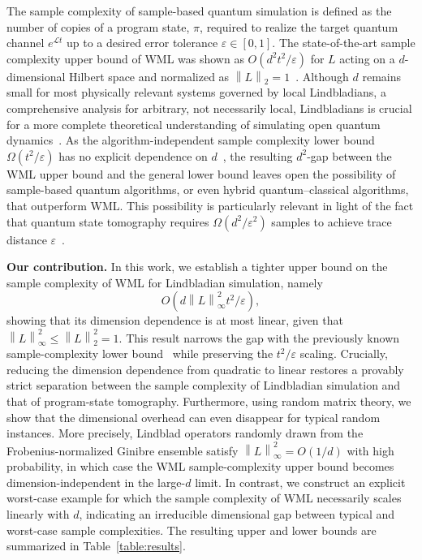 \documentclass[superscriptaddress,amsmath,amssymb,aps,pra,letterpaper,tightenlines,notitlepages,12pt]{revtex4-2}
\begin{document}
The sample complexity of sample-based quantum simulation is defined as the number of copies of a program state, $\pi$, required to realize the target quantum channel $e^{ \mathcal{L} t}$ up to a desired error tolerance $\varepsilon \in [0, 1]$. The state-of-the-art sample complexity upper bound of WML was shown as $O(d^2 t^2/\varepsilon)$ for $L$ acting on a $d$-dimensional Hilbert space and normalized as $\left\| L\right\|_2 = 1$~\cite{go2025SamplebasedHamiltonianLindbladian}. Although $d$ remains small for most physically relevant systems governed by local Lindbladians, a comprehensive analysis for arbitrary, not necessarily local, Lindbladians is crucial for a more complete theoretical understanding of simulating open quantum dynamics~\cite{kliesch2011DissipativeQuantumChurchTuring, cubitt2015StabilityLocalQuantuma, cleve2019EfficientQuantumAlgorithms, xu2019ExtremeDecoherenceQuantum, lin2025DissipativePreparationManybody}. As the algorithm-independent sample complexity lower bound $\Omega(t^2/\varepsilon)$ has no explicit dependence on $d$~\cite{go2025SamplebasedHamiltonianLindbladian}, the resulting $d^2$-gap between the WML upper bound and the general lower bound leaves open the possibility of sample-based quantum algorithms, or even hybrid quantum--classical algorithms, that outperform WML. This possibility is particularly relevant in light of the fact that quantum state tomography requires $\Omega(d^2/\varepsilon^2)$ samples to achieve trace distance $\varepsilon$~\cite{haah2016SampleoptimalTomographyQuantum, haah2017SampleoptimalTomographyQuantum, yuen2023ImprovedSampleComplexity, patel2023WaveMatrixLindbladizationa, anshu2023SurveyComplexityLearning}.

\bigskip

\noindent
\textbf{Our contribution.} In this work, we establish a tighter upper bound on the sample complexity of WML for Lindbladian simulation, namely
\begin{equation}
    O(d \left\|L\right\|_\infty^2 t^2/\varepsilon),
\end{equation} 
showing that its dimension dependence is at most linear, given that $\left\|L\right\|_\infty^2 \leq \left\| L\right\|_2^2 = 1$. This result narrows the gap with the previously known sample-complexity lower bound~\cite{go2025SamplebasedHamiltonianLindbladian} while preserving the $t^2/\varepsilon$ scaling. Crucially, reducing the dimension dependence from quadratic to linear restores a provably strict separation between the sample complexity of Lindbladian simulation and that of program-state tomography. 
Furthermore, using random matrix theory, we show that the dimensional overhead can even disappear for typical random instances. More precisely, Lindblad operators randomly drawn from the Frobenius-normalized Ginibre ensemble satisfy $\left\|L\right\|_\infty^2=O(1/d)$ with high probability, in which case the WML sample-complexity upper bound becomes dimension-independent in the large-$d$ limit. In contrast, we construct an explicit worst-case example for which the sample complexity of WML necessarily scales linearly with $d$, indicating an irreducible dimensional gap between typical and worst-case sample complexities. The resulting upper and lower bounds are summarized in Table~\ref{table:results}.
\end{document}

